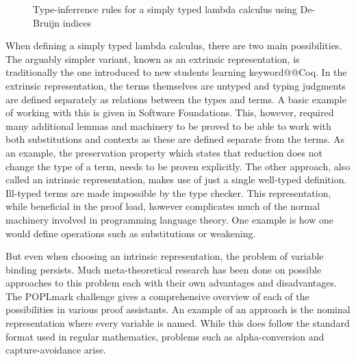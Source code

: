 \documentclass[12pt, final]{article}
\makeatletter
\def\<#1>{\csname keyword@@#1\endcsname}
\makeatother
\begin{document}
\begin{figure}
  \label{fig:stlc_infer}
  \caption{Type-inferrence rules for a simply typed lambda calculus using De-Bruijn indices}
\end{figure}

When defining a simply typed lambda calculus, there are two main possibilities\cite{plfa2019}.
The arguably simpler variant, known as an extrinsic representation, is traditionally the one introduced to new students learning \<Coq>.
In the extrinsic representation, the terms themselves are untyped and typing judgments are defined separately as relations between the types and terms. A basic example of working with this is given in Software Foundations\cite{Pierce:SF2}.
This, however, required many additional lemmas and machinery to be proved to be able to work with both substitutions and contexts as these are defined separate from the terms.
As an example, the preservation property which states that reduction does not change the type of a term, needs to be proven explicitly.
The other approach, also called an intrinsic representation, makes use of just a single well-typed definition.
Ill-typed terms are made impossible by the type checker.
This representation, while beneficial in the proof load, however complicates much of the normal machinery involved in programming language theory.
One example is how one would define operations such as substitutions or weakening.

But even when choosing an intrinsic representation, the problem of variable binding persists.
Much meta-theoretical research has been done on possible approaches to this problem each with their own advantages and disadvantages.
The POPLmark challenge gives a comprehensive overview of each of the possibilities in various proof assistants\cite{Aydemir2005}.
An example of an approach is the nominal representation where every variable is named.
While this does follow the standard format used in regular mathematics, problems such as alpha-conversion and capture-avoidance arise.
\end{document}
